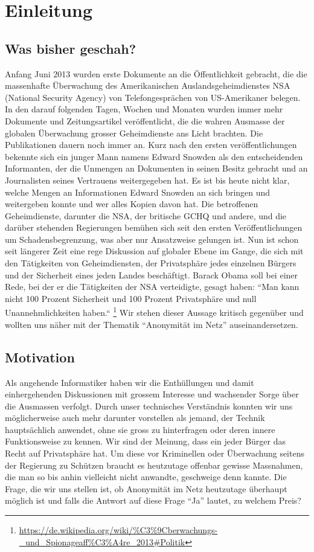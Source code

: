 \newpage
\section{Einleitung}

\subsection{Was bisher geschah?}
Anfang Juni 2013 wurden erste Dokumente an die Öffentlichkeit gebracht, die die massenhafte Überwachung des Amerikanischen Auslandsgeheimdienstes NSA (National Security Agency) von Telefongesprächen von US-Amerikaner belegen. In den darauf folgenden Tagen, Wochen und Monaten wurden immer mehr Dokumente und Zeitungsartikel veröffentlicht, die die wahren Ausmasse der globalen Überwachung grosser Geheimdienste ans Licht brachten. Die Publikationen dauern noch immer an. Kurz nach den ersten veröffentlichungen bekennte sich ein junger Mann namens Edward Snowden als den entscheidenden Informanten, der die Unmengen an Dokumenten in seinen Besitz gebracht und an Journalisten seines Vertrauens weitergegeben hat. Es ist bis heute nicht klar, welche Mengen an Informationen Edward Snowden an sich bringen und weitergeben konnte und wer alles Kopien davon hat. Die betroffenen Geheimdienste, darunter die NSA, der britische GCHQ und andere, und die darüber stehenden Regierungen bemühen sich seit den ersten Veröffentlichungen um Schadensbegrenzung, was aber nur Ansatzweise gelungen ist. Nun ist schon seit längerer Zeit eine rege Diskussion auf globaler Ebene im Gange, die sich mit den Tätigkeiten von Geheimdiensten, der Privatsphäre jedes einzelnen Bürgers und der Sicherheit eines jeden Landes beschäftigt. Barack Obama soll bei einer Rede, bei der er die Tätigkeiten der NSA verteidigte, gesagt haben: ``Man kann nicht 100 Prozent Sicherheit und 100 Prozent Privatsphäre und null Unannehmlichkeiten haben.“
\footnote{\url{https://de.wikipedia.org/wiki/\%C3\%9Cberwachungs-_und_Spionageaff\%C3\%A4re_2013\#Politik}}
Wir stehen dieser Aussage kritisch gegenüber und wollten uns näher mit der Thematik ``Anonymität im Netz'' auseinandersetzen. 

\subsection{Motivation}
Als angehende Informatiker haben wir die Enthüllungen und damit einhergehenden Diskussionen mit grossem Interesse und wachsender Sorge über die Ausmassen verfolgt. Durch unser technisches Verständnis konnten wir uns möglicherweise auch mehr darunter vorstellen als jemand, der Technik hauptsächlich anwendet, ohne sie gross zu hinterfragen oder deren innere Funktionsweise zu kennen. Wir sind der Meinung, dass ein jeder Bürger das Recht auf Privatsphäre hat. Um diese vor Kriminellen oder Überwachung seitens der Regierung zu Schützen braucht es heutzutage offenbar gewisse Massnahmen, die man so bis anhin vielleicht nicht anwandte, geschweige denn kannte. Die Frage, die wir uns stellen ist, ob Anonymität im Netz heutzutage überhaupt möglich ist und falls die Antwort auf diese Frage ``Ja'' lautet, zu welchem Preis? 


